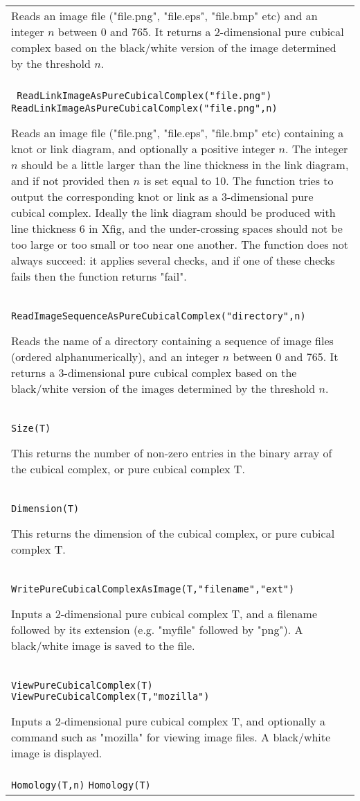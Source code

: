 \documentclass[a4paper,11pt]{report}
\begin{document}
{\begin{center}
\begin{tabular}{|l|}
 Reads an image file ("file.png", "file.eps", "file.bmp" etc) and an integer $n$ between 0 and 765. It returns a 2-dimensional pure cubical complex based on
the black/white version of the image determined by the threshold $n$. \\
 \index{ReadLinkImageAsPureCubicalComplex} \texttt{ ReadLinkImageAsPureCubicalComplex("file.png")} \texttt{ ReadLinkImageAsPureCubicalComplex("file.png",n)} 

 Reads an image file ("file.png", "file.eps", "file.bmp" etc) containing a knot
or link diagram, and optionally a positive integer $n$. The integer $n$ should be a little larger than the line thickness in the link diagram, and if
not provided then $n$ is set equal to 10. The function tries to output the corresponding knot or
link as a 3-dimensional pure cubical complex. Ideally the link diagram should
be produced with line thickness 6 in Xfig, and the under-crossing spaces
should not be too large or too small or too near one another. The function
does not always succeed: it applies several checks, and if one of these checks
fails then the function returns "fail". \\
 \index{ReadImageSequenceAsPureCubicalComplex} \texttt{ReadImageSequenceAsPureCubicalComplex("directory",n)} 

 Reads the name of a directory containing a sequence of image files (ordered
alphanumerically), and an integer $n$ between 0 and 765. It returns a 3-dimensional pure cubical complex based on
the black/white version of the images determined by the threshold $n$. \\
 \texttt{Size(T)} 

 This returns the number of non-zero entries in the binary array of the cubical
complex, or pure cubical complex T. \\
 \texttt{Dimension(T)} 

 This returns the dimension of the cubical complex, or pure cubical complex T. \\
 \index{WritePureCubicalComplexAsImage} \texttt{WritePureCubicalComplexAsImage(T,"filename","ext")} 

 Inputs a 2-dimensional pure cubical complex T, and a filename followed by its
extension (e.g. "myfile" followed by "png"). A black/white image is saved to
the file. \\
 \index{ViewPureCubicalComplex} \texttt{ViewPureCubicalComplex(T)} \texttt{ViewPureCubicalComplex(T,"mozilla")} 

 Inputs a 2-dimensional pure cubical complex T, and optionally a command such
as "mozilla" for viewing image files. A black/white image is displayed. \\
 \index{Homology} \texttt{Homology(T,n)} \texttt{Homology(T)} 


\end{tabular}
\end{center}}
\end{document}
